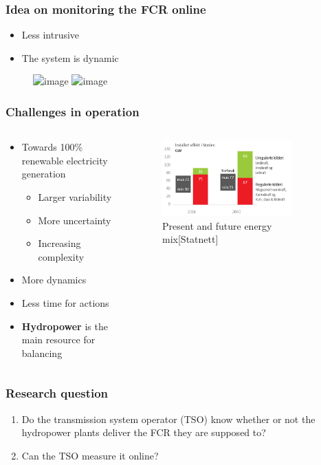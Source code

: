 \begin{frame}
	\frametitle{Idea on monitoring the FCR online}
	\begin{itemize}[<+->]
		\item Less intrusive
		\item The system is dynamic
	\end{itemize}
	\begin{figure}
		\includegraphics<2>[width=0.5\textwidth]{./pictures/static}
		\includegraphics<1>{./pictures/genTrafo.tikz}
	\end{figure}
\end{frame}
\begin{frame}
	\frametitle{Challenges in operation}
	\begin{columns}
		\begin{column}{0.5\textwidth}
		\begin{itemize}
			\item<1-> Towards 100\% renewable electricity generation
			\begin{itemize}
				\item Larger variability
				\item More uncertainty
				\item Increasing complexity
			\end{itemize}
			\item<2-> More dynamics
			\item<3-> Less time for actions
			\item<4-> \textbf{Hydropower} is the main resource for balancing
\end{itemize}
\end{column}
	\begin{column}{0.5\textwidth}
		\begin{figure}
			\includegraphics[width=0.8\textwidth]{./pictures/mix}
			\caption{Present and future energy mix[Statnett]}
		\end{figure}
	\end{column}
	\end{columns}
\end{frame}
\begin{frame}
	\frametitle{Research question}
	\begin{enumerate}
		\item<1-> Do the transmission system operator (TSO) know whether or not the hydropower plants deliver the FCR they are supposed to?
		\item<2-> Can the TSO measure it online?
	\end{enumerate}
\end{frame}
